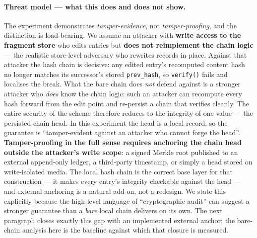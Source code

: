 \paragraph{Threat model --- what this does and does not show.}
The experiment demonstrates \emph{tamper-evidence}, not
\emph{tamper-proofing}, and the distinction is load-bearing. We
assume an attacker with \textbf{write access to the fragment
store} who edits entries but \textbf{does not reimplement the
chain logic} --- the realistic store-level adversary who rewrites
records in place. Against that attacker the hash chain is
decisive: any edited entry's recomputed content hash no longer
matches its successor's stored \texttt{prev\_hash}, so
\texttt{verify()} fails and localises the break. What the bare
chain does \emph{not} defend against is a stronger attacker who
\emph{does} know the chain logic: such an attacker can recompute
every hash forward from the edit point and re-persist a chain that
verifies cleanly. The entire security of the scheme therefore
reduces to the integrity of one value --- the persisted chain
head. In this experiment the head is a local record, so the
guarantee is ``tamper-evident against an attacker who cannot forge
the head''. \textbf{Tamper-proofing in the full sense requires
anchoring the chain head outside the attacker's write scope}: a
signed Merkle root published to an external append-only ledger, a
third-party timestamp, or simply a head stored on
write-isolated media. The local hash chain is the correct base
layer for that construction --- it makes every entry's integrity
checkable against the head --- and external anchoring is a natural
add-on, not a redesign. We state this explicitly because the
high-level language of ``cryptographic audit'' can suggest a
stronger guarantee than a \emph{bare} local chain delivers on its
own. The next paragraph closes exactly this gap with an implemented
external anchor; the bare-chain analysis here is the baseline
against which that closure is measured.

